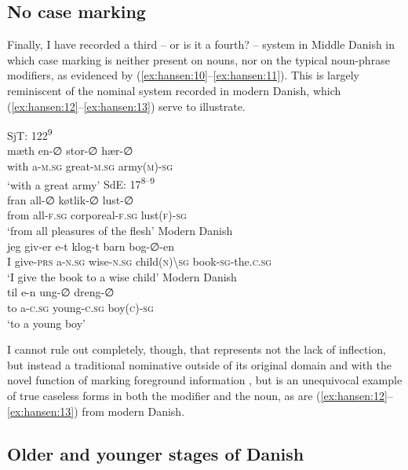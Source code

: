 \documentclass[output=paper]{langsci/langscibook}
\begin{document}
\subsection{No case marking} \label{hansen:2.4}

Finally, I have recorded a third – or is it a fourth? – system in Middle Danish in which case marking is neither present on nouns, nor on the typical noun-phrase modifiers, as evidenced by (\ref{ex:hansen:10}--\ref{ex:hansen:11}). This is largely reminiscent of the nominal system recorded in modern Danish, which (\ref{ex:hansen:12}--\ref{ex:hansen:13}) serve to illustrate.

\ea \label{ex:hansen:10}
{SjT: 122\textsuperscript{9}} \\ 
\gll mæth en-∅ stor-∅ hær-∅\\
     with a\textsc{{}-}\textsc{m.sg} great\textsc{{}-}\textsc{m.sg} army\textsc{(m)-sg}\\
\glt ‘with a great army’
\ex \label{ex:hansen:11}
{SdE: 17\textsuperscript{8–9}} \\ 
\gll fran all-∅ køtlik-∅ lust-∅\\
     from all\textsc{{}-}\textsc{f.sg} corporeal\textsc{{}-f.sg} lust\textsc{(f)-sg}\\
\glt ‘from all pleasures of the flesh’
\ex \label{ex:hansen:12}
{Modern Danish} \\ 
\gll jeg giv-er e-t klog-t barn bog-∅-en\\
     I give-\textsc{prs} a{}-\textsc{n.sg} wise\textsc{{}-n.sg} child\textsc{(n){\textbackslash}sg} book-\textsc{sg-}the\textsc{.c.sg}\\
\glt ‘I give the book to a wise child’
\ex \label{ex:hansen:13}
{Modern Danish} \\ 
\gll til e-n ung-∅ dreng-∅\\
     to a-\textsc{c.sg} young\textsc{{}-c.sg} boy\textsc{(c)-sg}\\
\glt ‘to a young boy’
\z

I cannot rule out completely, though, that  represents not the lack of inflection, but instead a traditional nominative outside of its original domain and with the novel function of marking foreground information \citep[264]{Jensen2011}, but  is an unequivocal example of true caseless forms in both the modifier and the noun, as are (\ref{ex:hansen:12}--\ref{ex:hansen:13}) from modern Danish.

\subsection{Older and younger stages of Danish} \label{hansen:2.5}
\end{document}
